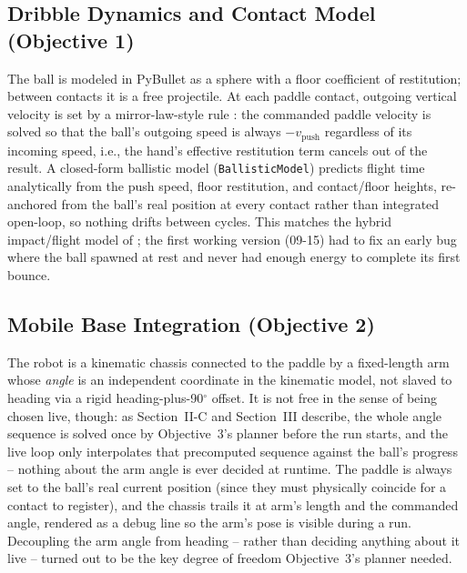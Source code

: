 \documentclass[10pt,twocolumn]{article}
\begin{document}
\subsection{Dribble Dynamics and Contact Model (Objective 1)}
The ball is modeled in PyBullet as a sphere with a floor coefficient of
restitution; between contacts it is a free projectile. At each paddle
contact, outgoing vertical velocity is set by a mirror-law-style rule
\cite{buehler1994}: the commanded paddle velocity is solved so that the
ball's outgoing speed is always $-v_{\text{push}}$ regardless of its
incoming speed, i.e., the hand's effective restitution term cancels out of
the result. A closed-form ballistic model (\texttt{BallisticModel})
predicts flight time analytically from the push speed, floor restitution,
and contact/floor heights, re-anchored from the ball's real position at
every contact rather than integrated open-loop, so nothing drifts between
cycles. This matches the hybrid impact/flight model of
\cite{buehler1994,batz2009}; the first working version (09-15) had to fix
an early bug where the ball spawned at rest and never had enough energy to
complete its first bounce.

\subsection{Mobile Base Integration (Objective 2)}
The robot is a kinematic chassis connected to the paddle by a fixed-length
arm whose \emph{angle} is an independent coordinate in the kinematic model,
not slaved to heading via a rigid heading-plus-90$^\circ$ offset. It is not
free in the sense of being chosen live, though: as Section~II-C and
Section~III describe, the whole angle sequence is solved once by
Objective~3's planner before the run starts, and the live loop only
interpolates that precomputed sequence against the ball's progress --
nothing about the arm angle is ever decided at runtime. The paddle is
always set to the ball's real current position (since they must physically
coincide for a contact to register), and the chassis trails it at arm's
length and the commanded angle, rendered as a debug line so the arm's pose
is visible during a run. Decoupling the arm angle from heading -- rather
than deciding anything about it live -- turned out to be the key degree of
freedom Objective~3's planner needed.
\end{document}
